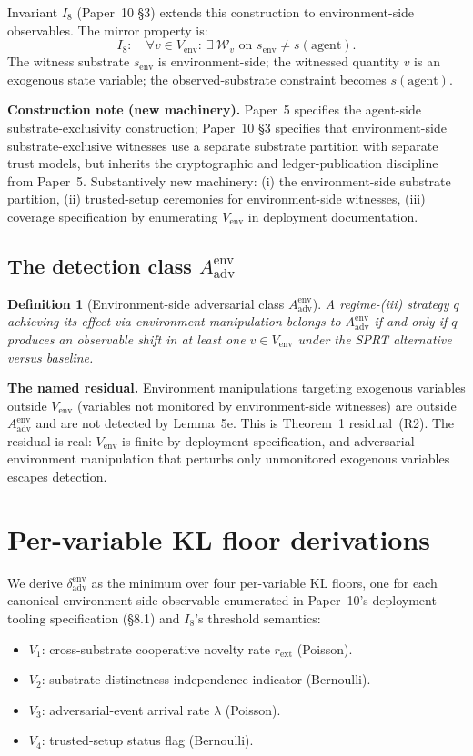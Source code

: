\documentclass{article}
\newtheorem{definition}{Definition}
\newcommand{\Aadv}{A_{\mathrm{adv}}}
\newcommand{\deltaadv}{\delta_{\mathrm{adv}}}
\newcommand{\Witness}{\mathcal{W}}
\newcommand{\rext}{r_{\mathrm{ext}}}
\begin{document}
Invariant $I_8$ (Paper~10 §3) extends this construction to
environment-side observables.  The mirror property is:
\[
  I_8: \quad \forall v \in V_{\mathrm{env}}:\
  \exists\ \Witness_v \text{ on } s_{\mathrm{env}} \neq
  s(\mathrm{agent}).
\]
The witness substrate $s_{\mathrm{env}}$ is environment-side; the
witnessed quantity $v$ is an exogenous state variable; the
observed-substrate constraint becomes $s(\mathrm{agent})$.

\textbf{Construction note (new machinery).}  Paper~5 specifies the
agent-side substrate-exclusivity construction; Paper~10 §3 specifies
that environment-side substrate-exclusive witnesses use a separate
substrate partition with separate trust models, but inherits the
cryptographic and ledger-publication discipline from Paper~5.
Substantively new machinery: (i) the environment-side substrate
partition, (ii) trusted-setup ceremonies for environment-side
witnesses, (iii) coverage specification by enumerating
$V_{\mathrm{env}}$ in deployment documentation.

\subsection{The detection class $\Aadv^{\mathrm{env}}$}

\begin{definition}[Environment-side adversarial class
$\Aadv^{\mathrm{env}}$]
A regime-(iii) strategy $q$ achieving its effect via environment
manipulation belongs to $\Aadv^{\mathrm{env}}$ if and only if $q$
produces an observable shift in at least one $v \in V_{\mathrm{env}}$
under the SPRT alternative versus baseline.
\end{definition}

\textbf{The named residual.}  Environment manipulations targeting
exogenous variables outside $V_{\mathrm{env}}$ (variables not
monitored by environment-side witnesses) are outside
$\Aadv^{\mathrm{env}}$ and are not detected by Lemma~5e.  This is
Theorem~1 residual~(R2).  The residual is real: $V_{\mathrm{env}}$
is finite by deployment specification, and adversarial environment
manipulation that perturbs only unmonitored exogenous variables
escapes detection.

\section{Per-variable KL floor derivations}

We derive $\deltaadv^{\mathrm{env}}$ as the minimum over four
per-variable KL floors, one for each canonical environment-side
observable enumerated in Paper~10's deployment-tooling
specification (\S8.1) and $I_8$'s threshold semantics:
\begin{itemize}
\item $V_1$: cross-substrate cooperative novelty rate $\rext$
  (Poisson).
\item $V_2$: substrate-distinctness independence indicator
  (Bernoulli).
\item $V_3$: adversarial-event arrival rate $\lambda$ (Poisson).
\item $V_4$: trusted-setup status flag (Bernoulli).
\end{itemize}
\end{document}
